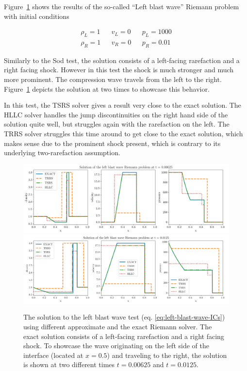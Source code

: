 Figure~\ref{fig:approximate-riemann-left-blast-wave} shows the results of the so-called ``Left
blast wave'' Riemann problem with initial conditions

\begin{align}
    \rho_L = 1 && v_L = 0 && p_L = 1000 \label{eq:left-blast-wave-ICs} \\
    \rho_R = 1 && v_R = 0 && p_R = 0.01      \nonumber
\end{align}

Similarly to the Sod test, the solution consists of a left-facing rarefaction and a right facing
shock. However in this test the shock is much stronger and much more prominent. The compression
wave travels from the left to the right. Figure~\ref{fig:approximate-riemann-left-blast-wave}
depicts the solution at two times to showcase this behavior.

In this test, the TSRS solver gives a result very close to the exact solution. The HLLC solver
handles the jump discontinuities on the right hand side of the solution quite well, but struggles
again with the rarefaction on the left. The TRRS solver struggles this time around to get close to
the exact solution, which makes sense due to the prominent shock present, which is contrary to its
underlying two-rarefaction assumption.

\begin{figure}
\centering
\includegraphics[width=\textwidth]{
./figures/FV/approximate_riemann_solvers/riemann-approximate-left_blast_wave-0.006.png} %
\\
\includegraphics[width=\textwidth]{
./figures/FV/approximate_riemann_solvers/riemann-approximate-left_blast_wave-0.013.png} %
\caption[Left blast wave solution with approximate Riemann solvers]{
    The solution to the left blast wave test (eq. \ref{eq:left-blast-wave-ICs}) using different
    approximate and the exact Riemann solver. The exact solution consists of a left-facing
    rarefaction and a right facing shock. To showcase the wave originating on the left side of the
    interface (located at $x=0.5$) and traveling to the right, the solution is shown at two
    different times $t = 0.00625$ and $t = 0.0125$.
    }%
    \label{fig:approximate-riemann-left-blast-wave}
\end{figure}


